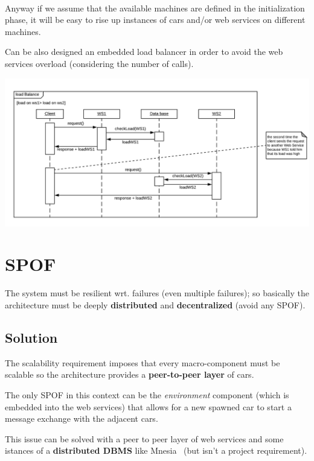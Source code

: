 \noindent
{}\\

\noindent
Anyway if we assume that the available machines are defined in the initialization phase,
it will be easy to rise up instances of cars and/or web services on different machines.

Can be also designed an embedded load balancer in order to avoid the web services overload 
(considering the number of calls).

\begin{center}
    \includegraphics[scale=0.6]{assets/ds2019_2.png}
\end{center}


\section{SPOF}

The system must be resilient wrt. failures (even multiple failures);
so basically the architecture must be deeply \textbf{distributed} 
and \textbf{decentralized} (avoid any SPOF). 


\subsection{Solution}

The scalability requirement imposes that every macro-component must be scalable 
so the architecture provides a \textbf{peer-to-peer layer} of cars.

The only SPOF in this context can be the \textit{environment} component 
(which is embedded into the web services) that allows for a new spawned car to 
start a message exchange with the adjacent cars. 

This issue can be solved 
with a peer to peer layer of web services and some istances of a 
\textbf{distributed DBMS} like Mnesia~\cite{1} (but isn't a project requirement).


